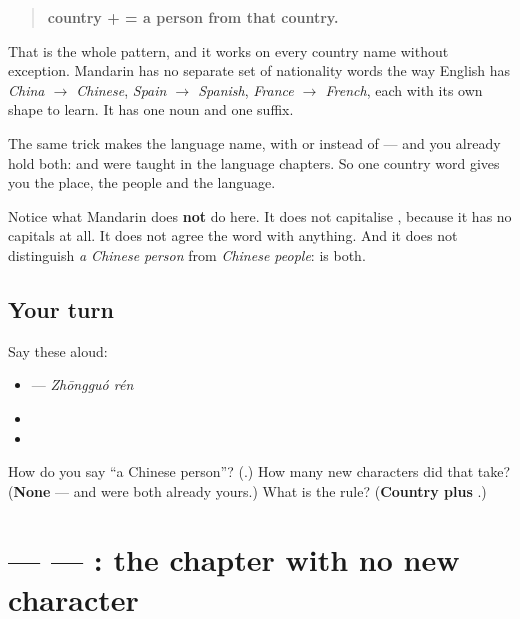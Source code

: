 \begin{grammarlens}[title={Grammar Lens: the rule, and how far it reaches}]
\begin{quote}
\textbf{country +  = a person from that country.}
\end{quote}

That is the whole pattern, and it works on every country name without exception. Mandarin has no separate set of nationality words the way English has \emph{China $\to$ Chinese}, \emph{Spain $\to$ Spanish}, \emph{France $\to$ French}, each with its own shape to learn. It has one noun and one suffix.

The same trick makes the language name, with  or  instead of  — and you already hold both: \textbf{} and \textbf{} were taught in the language chapters. So one country word gives you the place, the people and the language.

Notice what Mandarin does \textbf{not} do here. It does not capitalise , because it has no capitals at all. It does not agree the word with anything. And it does not distinguish \emph{a Chinese person} from \emph{Chinese people}:  is both.
\end{grammarlens}

\subsection*{Your turn}
Say these aloud:

\begin{itemize}
\raggedright
  \item {} — \emph{Zhōngguó rén}
  \item {}
  \item {}
\end{itemize}

\begin{tcolorbox}[breakable,colback=teal!4,colframe=teal!35!black,title={Before you move on}]
How do you say \textquotedblleft{}a Chinese person\textquotedblright{}? (\textbf{}.) How many new characters did that take? (\textbf{None} —  and  were both already yours.) What is the rule? (\textbf{Country plus }.)
\end{tcolorbox}
\section[Practice]{ —  — : the chapter with no new character}

